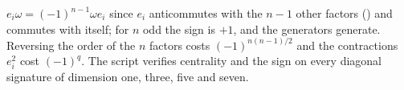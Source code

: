 $e_{i}\omega = (-1)^{n-1}\omega e_{i}$ since $e_{i}$ anticommutes with the $n - 1$ other factors () and commutes with itself; for $n$ odd the sign is $+1$, and the generators generate. Reversing the order of the $n$ factors costs $(-1)^{n(n-1)/2}$ and the contractions $e_{i}^{2}$ cost $(-1)^{q}$. The script verifies centrality and the sign on every diagonal signature of dimension one, three, five and seven.
